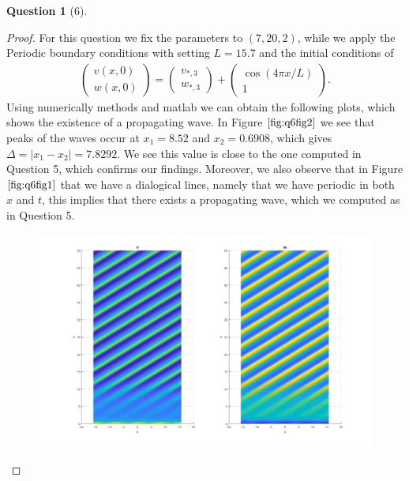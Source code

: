 \documentclass[11pt]{article}
\theoremstyle{quest}
\newtheorem*{question}{Question}
\begin{document}
\begin{question}[6]
    
\end{question}
\begin{proof}
    For this question we fix the parameters to $(7,20,2)$, while we apply the Periodic boundary
    conditions with setting $L=15.7$ and the initial conditions of
    \begin{align*}
        \begin{pmatrix}
            v(x,0) \\ w(x,0)
        \end{pmatrix}
        =
        \begin{pmatrix}
            v_{*,3} \\ w_{*,3}
        \end{pmatrix}
        +
        \begin{pmatrix}
            \cos{ \left( 4 \pi x / L \right)  } \\ 1
        \end{pmatrix}.
    \end{align*}
    Using numerically methods and matlab we can obtain the following plots, which shows
    the existence of a propagating wave. In Figure $\ref{fig:q6fig2}$ we see that peaks of the
    waves occur at $x_1 = 8.52$ and $x_2= 0.6908$, which gives $\Delta = | x_1 - x_2 | = 7.8292$.
    We see this value is close to the one computed in Question 5, which confirms our findings.
    Moreover, we also observe that in Figure $\ref{fig:q6fig1}$ that we have a dialogical lines,
    namely that we have periodic in both $x$ and $t$, this implies that there exists a propagating
    wave, which we computed as in  Question 5.
    \begin{figure}[h!]
        \includegraphics[width=\linewidth]{figures/Q6_fig1.jpg}

\end{figure}
\end{proof}
\end{document}
